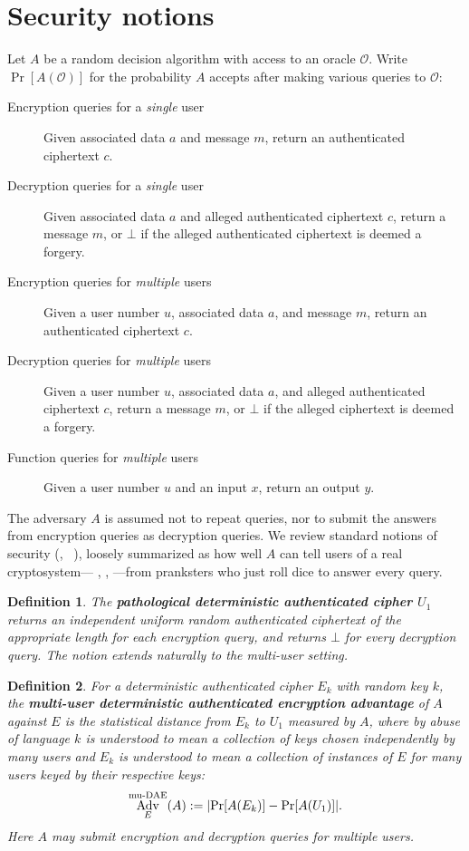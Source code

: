 \documentclass{article}
\newtheorem{definition}{Definition}
\newcommand{\term}[1]{\textbf{#1}}
\def\operatorsc#1{{%
  \ifmmode\let\next=\operatorname\else\let\next=\relax\fi\next{\textsc{#1}}}}
\def\XSalsa#1/{\operatorsc{XSalsa#1}}
\def\DAENCE/{\operatorsc{Daence}}
\def\muDAE{%
  \ifmmode\def\next{\operatorname{mu-DAE}}%
    \else\def\next/{mu-\textsc{dae}}%
  \fi\next}
\DeclareMathOperator{\Adv}{Adv}
\begin{document}
\section{Security notions}

Let $A$ be a random decision algorithm with access to an oracle
 $\mathcal O$.
Write $\Pr[A(\mathcal O)]$ for the probability $A$ accepts after
 making various queries to $\mathcal O$:
%
\begin{description}
  \item[Encryption queries for a \emph{single} user]
    Given associated data $a$ and message $m$, return an authenticated
     ciphertext $c$.
  \item[Decryption queries for a \emph{single} user]
    Given associated data $a$ and alleged authenticated ciphertext
     $c$, return a message $m$, or $\bot$ if the alleged authenticated
     ciphertext is deemed a forgery.
  \item[Encryption queries for \emph{multiple} users]
    Given a user number $u$, associated data $a$, and message $m$,
     return an authenticated ciphertext $c$.
  \item[Decryption queries for \emph{multiple} users]
    Given a user number $u$, associated data $a$, and alleged
     authenticated ciphertext $c$, return a message $m$, or $\bot$ if
     the alleged ciphertext is deemed a forgery.
  \item[Function queries for \emph{multiple} users]
    Given a user number $u$ and an input $x$, return an output $y$.
\end{description}
%
The adversary $A$ is assumed not to repeat queries, nor to submit the
 answers from encryption queries as decryption queries.
We review standard notions of security
 (\eg,~%
  \cite[Definition~1]{rogaway-shrimpton2006keywrap}%
  \cite[\S3]{bellare-tackmann2016mu-ae-crypto}),
 loosely summarized as how well $A$ can tell users of a real
 cryptosystem---\DAENCE/, \XSalsa20/, \etc---from pranksters who just
 roll dice to answer every query.

\begin{definition}
  The \term{pathological deterministic authenticated cipher $U_1$}
   returns an independent uniform random authenticated ciphertext of
   the appropriate length for each encryption query, and returns
   $\bot$ for every decryption query.
  The notion extends naturally to the multi-user setting.
\end{definition}

\begin{definition}
  For a deterministic authenticated cipher $E_k$ with random key $k$,
   the
   \term{multi-user deterministic authenticated encryption advantage}
   of $A$ against $E$ is the statistical distance from $E_k$ to $U_1$
   measured by $A$, where by abuse of language $k$ is understood to
   mean a collection of keys chosen independently by many users and
   $E_k$ is understood to mean a collection of instances of $E$ for
   many users keyed by their respective keys:
  \[
    \Adv^{\muDAE}_E(A) := \lvert\Pr[A(E_k)] - \Pr[A(U_1)]\rvert.
  \]
  Here $A$ may submit encryption and decryption queries for
   \emph{multiple} users.
\end{definition}
\end{document}
